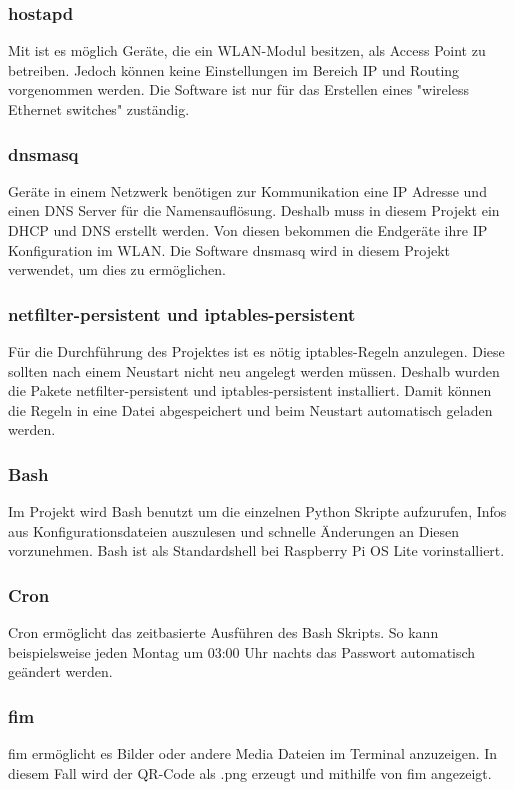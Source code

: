 \documentclass[a4paper,11pt,singlespacing]{article}
\begin{document}
    		\subsubsection{hostapd}
        		Mit  ist es möglich Geräte, die ein WLAN-Modul besitzen, als Access Point zu betreiben. Jedoch können keine Einstellungen im Bereich IP und Routing vorgenommen werden. Die Software ist nur für das Erstellen eines "wireless Ethernet switches" zuständig. \cite{Quote_hostapd1} 
    		\subsubsection{dnsmasq}
        		Geräte in einem Netzwerk benötigen zur Kommunikation eine IP Adresse und einen DNS Server für die Namensauflösung. Deshalb muss in diesem Projekt ein DHCP und DNS erstellt werden. Von diesen bekommen die Endgeräte ihre IP Konfiguration im WLAN. Die Software dnsmasq wird in diesem Projekt verwendet, um dies zu ermöglichen.
    		\subsubsection{netfilter-persistent und iptables-persistent}
        		Für die Durchführung des Projektes ist es nötig iptables-Regeln anzulegen. Diese sollten nach einem Neustart nicht neu angelegt werden müssen. Deshalb wurden die Pakete netfilter-persistent und iptables-persistent installiert. Damit können die Regeln in eine Datei abgespeichert und beim Neustart automatisch geladen werden.
        	\subsubsection{Bash}
        		Im Projekt wird Bash benutzt um die einzelnen Python Skripte aufzurufen, Infos aus Konfigurationsdateien auszulesen und schnelle Änderungen an Diesen vorzunehmen. Bash ist als Standardshell bei Raspberry Pi OS Lite vorinstalliert. 
    		\subsubsection{Cron}
				Cron ermöglicht das zeitbasierte Ausführen des Bash Skripts. So kann beispielsweise jeden Montag um 03:00 Uhr nachts das Passwort automatisch geändert werden.
			\subsubsection{fim}
				fim ermöglicht es Bilder oder andere Media Dateien im Terminal anzuzeigen. In diesem Fall wird der QR-Code als .png erzeugt und mithilfe von fim angezeigt. \cite{Quote_man_fim}
\end{document}
